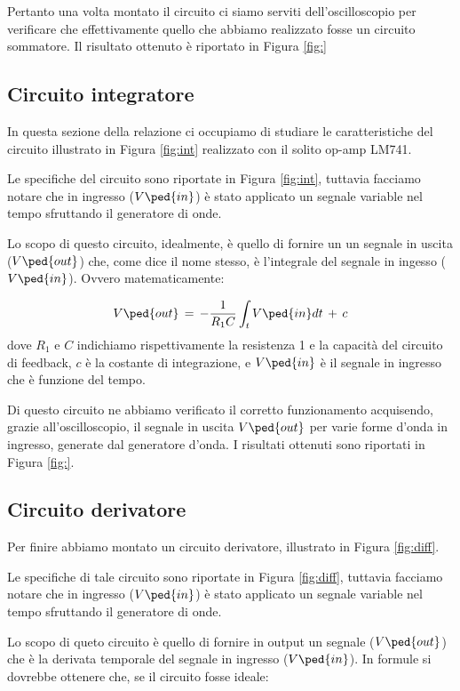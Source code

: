 Pertanto una volta montato il circuito ci siamo serviti dell'oscilloscopio per verificare che effettivamente quello che abbiamo realizzato fosse un circuito sommatore. Il risultato ottenuto è riportato in Figura \ref{fig:}

\subsection*{Circuito integratore}

In questa sezione della relazione ci occupiamo di studiare le caratteristiche del circuito illustrato in Figura \ref{fig:int} realizzato con il solito op-amp LM741.

Le specifiche del circuito sono riportate in Figura \ref{fig:int}, tuttavia facciamo notare che in ingresso ($V\ped{in}$) è stato applicato un segnale variable nel tempo sfruttando il generatore di onde.
 
Lo scopo di questo circuito, idealmente, è quello di fornire un un segnale in uscita ($V\ped{out}$) che, come dice il nome stesso, è l'integrale del segnale in ingesso ($V\ped{in}$). Ovvero matematicamente:

\begin{equation}
        V\ped{out}\,=\,-\frac{1}{R_1C} \int_{t}{V\ped{in}dt}\,+\,c
\end{equation}
%
dove $R_1$ e $C$ indichiamo rispettivamente la resistenza 1 e la capacità del circuito di feedback, $c$ è la costante di integrazione, e $V\ped{in}$ è il segnale in ingresso che è funzione del tempo.

Di questo circuito ne abbiamo verificato il corretto funzionamento acquisendo, grazie all'oscilloscopio, il segnale in uscita $V\ped{out}$ per varie forme d'onda in ingresso, generate dal generatore d'onda. I risultati ottenuti sono riportati in Figura \ref{fig:}.

\subsection*{Circuito derivatore}

Per finire abbiamo montato un circuito derivatore, illustrato in Figura \ref{fig:diff}.

Le specifiche di tale circuito sono riportate in Figura \ref{fig:diff}, tuttavia facciamo notare che in ingresso ($V\ped{in}$) è stato applicato un segnale variable nel tempo sfruttando il generatore di onde.

Lo scopo di queto circuito è quello di fornire in output un segnale ($V\ped{out}$) che è la derivata temporale del segnale in ingresso ($V\ped{in}$). In formule si dovrebbe ottenere che, se il circuito fosse ideale:


